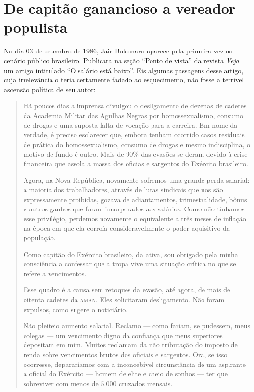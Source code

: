 \section{De capitão ganancioso a vereador populista}

\noindent{}No dia 03 de setembro de 1986, Jair Bolsonaro aparece pela primeira vez
no cenário público brasileiro. Publicara na seção ``Ponto de vista'' da
revista \emph{Veja} um artigo intitulado ``O salário está baixo''. Eis
algumas passagens desse artigo, cuja irrelevância o teria certamente
fadado ao esquecimento, não fosse a terrível ascensão política de seu
autor:

\begin{quote}
Há poucos dias a imprensa divulgou o desligamento de dezenas de cadetes
da Academia Militar das Agulhas Negras por homossexualismo, consumo de
drogas e uma suposta falta de vocação para a carreira. Em nome da
verdade, é preciso esclarecer que, embora tenham ocorrido casos
residuais de prática do homossexualismo,
consumo de drogas e mesmo
indisciplina, o motivo de fundo é outro. Mais de 90\% das evasões se
deram devido à crise financeira que assola a massa dos oficias e
sargentos do Exército brasileiro.

Agora, na Nova República, novamente sofremos uma grande perda salarial:
a maioria dos trabalhadores, através de lutas sindicais que nos são
expressamente proibidas, gozava de adiantamentos, trimestralidade, bônus
e outros ganhos que foram incorporados aos salários. Como não tínhamos
esse privilégio, perdemos novamente o equivalente a três meses de
inflação na época em que ela corroía consideravelmente o poder
aquisitivo da população.

Como capitão do Exército brasileiro, da ativa, sou obrigado pela minha
consciência a confessar que a tropa vive uma situação crítica no que se
refere a vencimentos.

Esse quadro é a causa sem retoques da evasão, até agora, de mais de
oitenta cadetes da \textsc{aman}. Eles solicitaram desligamento. Não foram
expulsos, como sugere o noticiário.

Não pleiteio aumento salarial. Reclamo --- como fariam, se pudessem, meus
colegas --- um vencimento digno da confiança que meus superiores
depositam em mim. Muitos reclamam da não tributação do imposto de renda
sobre vencimentos brutos dos oficiais e sargentos. Ora, se isso
ocorresse, depararíamos com a inconcebível circunstância de um aspirante
a oficial do Exército --- homem de elite e cheio de sonhos --- ter que
sobreviver com menos de 5.000 cruzados mensais.


\end{quote}
